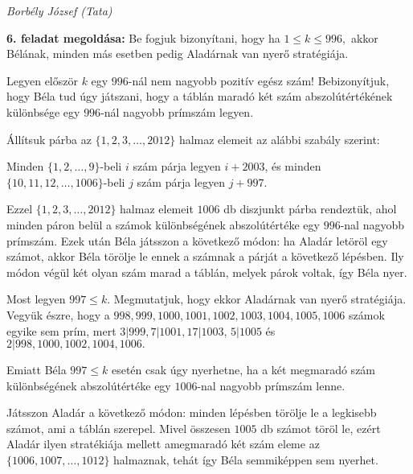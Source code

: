 \documentclass[a4paper,10pt]{article}
\def\ki#1#2{\hfill {\it #1 (#2)}\medskip}
\begin{document}
\ki{Borbély József}{Tata}\medskip

{\bf 6. feladat megoldása: } Be fogjuk bizonyítani, hogy ha $1\le k\le 996,$ akkor Bélának, minden más esetben pedig Aladárnak van nyerő stratégiája.

Legyen először $k$ egy $996$-nál nem nagyobb pozitív egész szám! Bebizonyítjuk, hogy Béla tud úgy játszani, hogy a táblán maradó két szám abszolútértékének különbsége egy $996$-nál nagyobb prímszám legyen.

Állítsuk párba az $\{1, 2, 3, \dots, 2012\}$ halmaz elemeit az alábbi szabály szerint:

Minden $\{1, 2,\dots, 9\}$-beli $i$ szám párja legyen $i+2003$, és minden $\{10, 11, 12, \dots, 1006\}$-beli $j$ szám párja legyen $j+997$.

Ezzel $\{1, 2, 3, \dots, 2012\}$ halmaz elemeit $1006$ db diszjunkt párba rendeztük, ahol minden páron belül a számok különbségének abszolútértéke egy $996$-nal nagyobb prímszám. Ezek után Béla játsszon a következő módon: ha Aladár letöröl egy számot, akkor Béla törölje le ennek a számnak a párját a következő lépésben. Ily módon végül két olyan szám marad a táblán, melyek párok voltak, így Béla nyer.

Most legyen $997\le k$. Megmutatjuk, hogy ekkor Aladárnak van nyerő stratégiája. Vegyük észre, hogy a $998, 999, 1000, 1001, 1002, 1003, 1004, 1005, 1006$ számok egyike sem prím, mert $3|999, 7|1001,17|1003$, $5|1005$ és $2|998, 1000, 1002, 1004, 1006.$

Emiatt Béla $997\le k$ esetén csak úgy nyerhetne, ha a két megmaradó szám különbségének abszolútértéke egy $1006$-nal nagyobb prímszám lenne.

Játsszon Aladár a következő módon: minden lépésben törölje le a legkisebb számot, ami a táblán szerepel. Mivel összesen $1005$ db számot töröl le, ezért Aladár ilyen stratékiája mellett amegmaradó két szám eleme az $\{1006, 1007,\dots, 1012\}$ halmaznak, tehát így Béla semmiképpen sem nyerhet.

\medskip

\vfill
\end{document}
